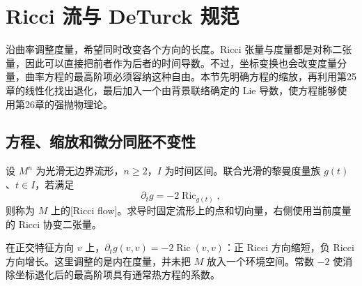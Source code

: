 
% 
% 

\section{Ricci 流与 DeTurck 规范}
\label{g3:sec:2701}

沿曲率调整度量，希望同时改变各个方向的长度。Ricci 张量与度量都是对称二张量，因此可以直接把前者作为后者的时间导数。不过，坐标变换也会改变度量分量，曲率方程的最高阶项必须容纳这种自由。本节先明确方程的缩放，再利用第25章的线性化找出退化，最后加入一个由背景联络确定的 Lie 导数，使方程能够使用第26章的强抛物理论。

\subsection{方程、缩放和微分同胚不变性}
\label{g3:subsec:2701:01}
\begin{definition}\label{g3:def:ricci-flow}
	设 \(M^n\) 为光滑无边界流形，\(n\ge2\)，\(I\) 为时间区间。联合光滑的黎曼度量族 \(g(t)\)、\(t\in I\)，若满足
	\begin{equation}\label{g3:eq:ricci-flow}
		\partial_tg=-2\operatorname{Ric}_{g(t)},
	\end{equation}
	则称为 \(M\) 上的[Ricci flow]。求导时固定流形上的点和切向量，右侧使用当前度量的 Ricci 协变二张量。
\end{definition}

在正交特征方向 \(v\) 上，\(\partial_tg(v,v)=-2\operatorname{Ric}(v,v)\)：正 Ricci 方向缩短，负 Ricci 方向增长。这里调整的是内在度量，并未把 \(M\) 放入一个环境空间。常数 \(-2\) 使消除坐标退化后的最高阶项具有通常热方程的系数。

